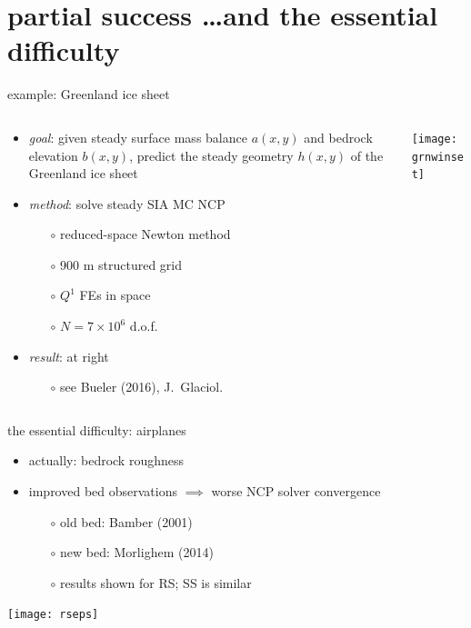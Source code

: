 \documentclass[xcolor={dvipsnames}]{beamer}
\begin{document}
\section{partial success \dots and the essential difficulty}

\begin{frame}{example: Greenland ice sheet}

\begin{columns}
\begin{column}{0.6\textwidth}
\begin{itemize}
\item \emph{goal}: given steady surface mass balance $a(x,y)$ and bedrock elevation $b(x,y)$, predict the steady geometry $h(x,y)$ of the Greenland ice sheet

\bigskip
\item \emph{method}: solve steady SIA MC NCP
  \begin{itemize}
  \item[$\circ$] reduced-space Newton method
  \item[$\circ$] 900 m structured grid
  \item[$\circ$] $Q^1$ FEs in space
  \item[$\circ$] $N=7\times 10^6$ d.o.f.
  \end{itemize}
\item \emph{result}: at right
  \begin{itemize}
  \item[$\circ$] see Bueler (2016), J.~Glaciol.
  \end{itemize}
\end{itemize}
\end{column}
\begin{column}{0.4\textwidth}
\vspace{-5mm}

\begin{center}
\texttt{[image: grnwinset]}
\end{center}
\end{column}
\end{columns}
\end{frame}



\begin{frame}{the essential difficulty: airplanes}

\begin{itemize}
\item actually: \alert{bedrock roughness}
\item improved bed observations $\implies$ worse NCP solver convergence
  \begin{itemize}
  \item[$\circ$] old bed: Bamber (2001)
  \item[$\circ$] new bed: Morlighem (2014)
  \item[$\circ$] results shown for RS; SS is similar
  \end{itemize}
\end{itemize}

\begin{center}
\texttt{[image: rseps]}
\end{center}
\end{frame}
\end{document}
